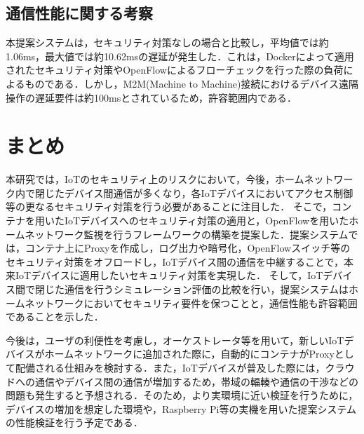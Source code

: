 \documentclass[Japanese]{dicomopapers}
\begin{document}
\subsection{通信性能に関する考察}
本提案システムは，セキュリティ対策なしの場合と比較し，平均値では約1.06ms，最大値では約10.62msの遅延が発生した．これは，Dockerによって適用されたセキュリティ対策やOpenFlowによるフローチェックを行った際の負荷によるものである．しかし，M2M(Machine to Machine)接続におけるデバイス遠隔操作の遅延要件は約100msとされている\cite{latency}ため，許容範囲内である．\par

\section{まとめ}
本研究では，IoTのセキュリティ上のリスクにおいて，今後，ホームネットワーク内で閉じたデバイス間通信が多くなり，各IoTデバイスにおいてアクセス制御等の更なるセキュリティ対策を行う必要があることに注目した．
そこで，コンテナを用いたIoTデバイスへのセキュリティ対策の適用と，OpenFlowを用いたホームネットワーク監視を行うフレームワークの構築を提案した．提案システムでは，コンテナ上にProxyを作成し，ログ出力や暗号化，OpenFlowスイッチ等のセキュリティ対策をオフロードし，IoTデバイス間の通信を中継することで，本来IoTデバイスに適用したいセキュリティ対策を実現した．
そして，IoTデバイス間で閉じた通信を行うシミュレーション評価の比較を行い，提案システムはホームネットワークにおいてセキュリティ要件を保つことと，通信性能も許容範囲であることを示した．\par
今後は，ユーザの利便性を考慮し，オーケストレータ等を用いて，新しいIoTデバイスがホームネットワークに追加された際に，自動的にコンテナがProxyとして配備される仕組みを検討する．また，IoTデバイスが普及した際には，クラウドへの通信やデバイス間の通信が増加するため，帯域の輻輳や通信の干渉などの問題も発生すると予想される．そのため，より実環境に近い検証を行うために，デバイスの増加を想定した環境や，Raspberry Pi等の実機を用いた提案システムの性能検証を行う予定である．
\end{document}
